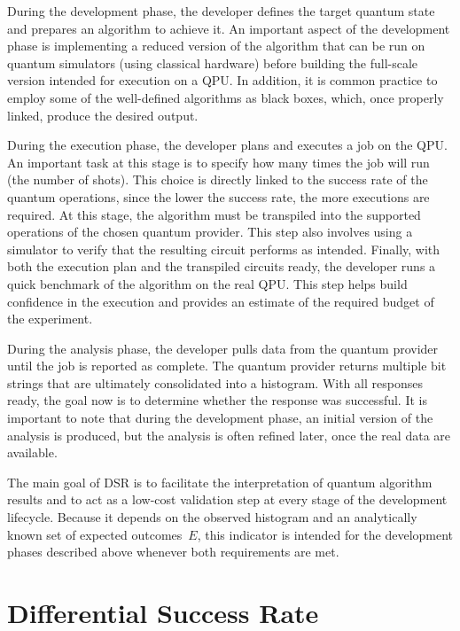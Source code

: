 \documentclass[10pt,conference]{IEEEtran}
\begin{document}
During the development phase, the developer defines the target quantum state and prepares an algorithm to achieve it. An important aspect of the development phase is implementing a reduced version of the algorithm that can be run on quantum simulators (using classical hardware) before building the full-scale version intended for execution on a QPU. In addition, it is common practice to employ some of the well-defined algorithms as black boxes, which, once properly linked, produce the desired output.

During the execution phase, the developer plans and executes a job on the QPU. An important task at this stage is to specify how many times the job will run (the number of shots). This choice is directly linked to the success rate of the quantum operations, since the lower the success rate, the more executions are required. At this stage, the algorithm must be transpiled into the supported operations of the chosen quantum provider. This step also involves using a simulator to verify that the resulting circuit performs as intended. Finally, with both the execution plan and the transpiled circuits ready, the developer runs a quick benchmark of the algorithm on the real QPU. This step helps build confidence in the execution and provides an estimate of the required budget of the experiment.

During the analysis phase, the developer pulls data from the quantum provider until the job is reported as complete. The quantum provider returns multiple bit strings that are ultimately consolidated into a histogram. With all responses ready, the goal now is to determine whether the response was successful. It is important to note that during the development phase, an initial version of the analysis is produced, but the analysis is often refined later, once the real data are available.

The main goal of DSR is to facilitate the interpretation of quantum algorithm results and to act as a low-cost validation step at every stage of the development lifecycle. Because it depends on the observed histogram and an analytically known set of expected outcomes~$E$, this indicator is intended for the development phases described above whenever both requirements are met.

\section{Differential Success Rate}
\label{sec:dsr}
\end{document}
